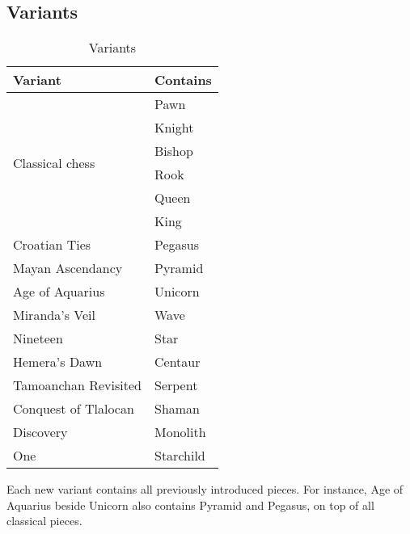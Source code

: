 \clearpage %

\subsection*{Variants}
\label{sec:Appendix/Introduction/Variants}

\begin{table}[!h]
\centering
\begin{tabular}{ ll }
\toprule
\textbf{Variant} & \textbf{Contains}           \\
\midrule
\multirow{6}{*}{Classical chess} & Pawn        \\
                                 & Knight      \\
                                 & Bishop      \\
                                 & Rook        \\
                                 & Queen       \\
                                 & King        \\ \cmidrule{1-2}
Croatian Ties                    & Pegasus     \\
Mayan Ascendancy                 & Pyramid     \\
Age of Aquarius                  & Unicorn     \\
Miranda's Veil                   & Wave        \\
Nineteen                         & Star        \\
Hemera's Dawn                    & Centaur     \\
Tamoanchan Revisited             & Serpent     \\
Conquest of Tlalocan             & Shaman      \\
Discovery                        & Monolith    \\
One                              & Starchild   \\
\bottomrule
\end{tabular}
\caption{Variants}
\label{tbl:Appendix/Introduction/Variants}
\end{table}

Each new variant contains all previously introduced pieces. For instance, Age of Aquarius
beside Unicorn also contains Pyramid and Pegasus, on top of all classical pieces.

\clearpage %

